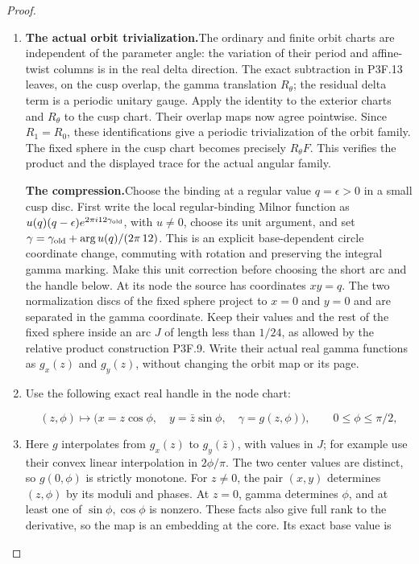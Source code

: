 \begin{proof}
\begin{enumerate}[label=\arabic*.]
\item \par\medskip\noindent\textbf{The actual orbit trivialization.}\enspace The ordinary and finite
orbit charts are independent of the parameter angle: the variation
of their period and affine-twist columns is in the real delta
direction.  The exact subtraction in P3F.13 leaves, on the cusp
overlap, the gamma translation \(R_\theta\); the residual delta term
is a periodic unitary gauge.  Apply the identity to the exterior
charts and \(R_\theta\) to the cusp chart.  Their overlap maps now
agree pointwise.  Since \(R_1=R_0\), these identifications give a
periodic trivialization of the orbit family.  The fixed sphere in
the cusp chart becomes precisely \(R_\theta F\).  This verifies the
product and the displayed trace for the actual angular family.

\par\medskip\noindent\textbf{The compression.}\enspace Choose the binding at a regular value
\(q=\epsilon>0\) in a small cusp disc.  First write the local
regular-binding Milnor function as
\(u(q)(q-\epsilon)e^{2\pi i12\gamma_{\rm old}}\), with \(u\ne0\),
choose its unit argument, and set
\(\gamma=\gamma_{\rm old}+\arg u(q)/(2\pi\,12)\).
This is an explicit base-dependent circle coordinate change,
commuting with rotation and preserving the integral gamma marking.
Make this unit correction before choosing the short arc and the
handle below.  At its node the source has
coordinates \(xy=q\).  The two normalization discs of the fixed
sphere project to \(x=0\) and \(y=0\) and are separated in the gamma
coordinate.  Keep their values and the rest of the fixed sphere
inside an arc \(J\) of length less than \(1/24\), as allowed by the
relative product construction P3F.9.  Write their actual real gamma
functions as \(g_x(z)\) and \(g_y(z)\), without changing the orbit
map or its page.

\item Use the following exact real handle in the node chart:

\[
 (z,\phi)\longmapsto
 \bigl(x=z\cos\phi,\quad y=\bar z\sin\phi,\quad
       \gamma=g(z,\phi)\bigr),
 \qquad 0\leq\phi\leq\pi/2,
\]

\item Here \(g\) interpolates from \(g_x(z)\) to \(g_y(\bar z)\), with
values in \(J\); for example use their convex linear interpolation
in \(2\phi/\pi\).  The two center values are distinct, so
\(g(0,\phi)\) is strictly monotone.  For \(z\ne0\), the pair
\((x,y)\) determines \((z,\phi)\) by its moduli and phases.  At
\(z=0\), gamma determines \(\phi\), and at least one of
\(\sin\phi,\cos\phi\) is nonzero.  These facts also give full
rank to the derivative, so the map is an embedding at the core.
Its exact base value is


\end{enumerate}
\end{proof}
